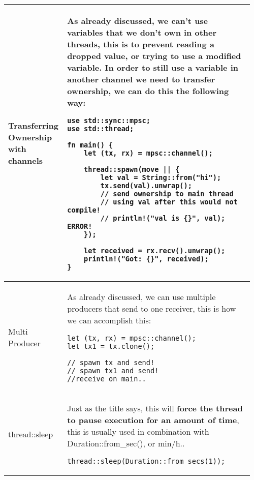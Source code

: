 \documentclass[main.tex,fontsize=8pt,paper=a4,paper=portrait,DIV=calc,]{scrartcl}
\begin{document}
\begin{table}[ht!]
\begin{tabular}{|m{0.2\linewidth}|m{0.755\linewidth}|}
\hline
Transferring Ownership with channels & 
As already discussed, we can't use variables that we don't own in other threads, this is to prevent reading a dropped value, or trying to use a modified variable.\newline
In order to still use a variable in another channel we need to \textbf{transfer ownership}, we can do this the following way:\newline
\begin{lstlisting}
use std::sync::mpsc;
use std::thread;

fn main() {
    let (tx, rx) = mpsc::channel();

    thread::spawn(move || {
        let val = String::from("hi");
        tx.send(val).unwrap();
        // send ownership to main thread
        // using val after this would not compile!
        // println!("val is {}", val); ERROR!
    });

    let received = rx.recv().unwrap();
    println!("Got: {}", received);
}
\end{lstlisting}\\
\hline
Multi Producer & 
As already discussed, we can use multiple producers that send to one receiver, this is how we can accomplish this:\newline
\begin{lstlisting}
let (tx, rx) = mpsc::channel();
let tx1 = tx.clone();

// spawn tx and send!
// spawn tx1 and send!
//receive on main..
\end{lstlisting}\\
\hline
thread::sleep & 
Just as the title says, this will \textbf{force the thread to pause execution for an amount of time},\newline
this is usually used in combination with Duration::from\_sec(), or min/h..\newline
\begin{lstlisting}
thread::sleep(Duration::from_secs(1));
\end{lstlisting}\\
\hline

\hline
\end{tabular}
\end{table}
\pagebreak
\end{document}
